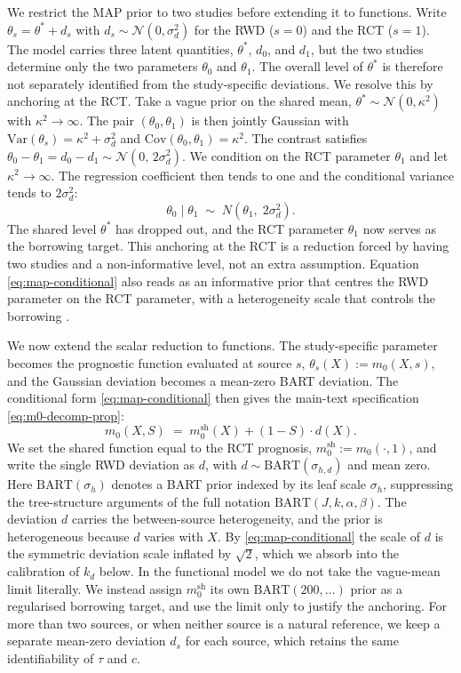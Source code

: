 We restrict the MAP prior to two studies before extending it to functions.
Write $\theta_s = \theta^* + d_s$ with $d_s \sim \mathcal{N}(0, \sigma_d^2)$ for the RWD ($s = 0$) and the RCT ($s = 1$).
The model carries three latent quantities, $\theta^*$, $d_0$, and $d_1$, but the two studies determine only the two parameters $\theta_0$ and $\theta_1$.
The overall level of $\theta^*$ is therefore not separately identified from the study-specific deviations.
We resolve this by anchoring at the RCT.
Take a vague prior on the shared mean, $\theta^* \sim \mathcal{N}(0, \kappa^2)$ with $\kappa^2 \to \infty$.
The pair $(\theta_0, \theta_1)$ is then jointly Gaussian with $\mathrm{Var}(\theta_s) = \kappa^2 + \sigma_d^2$ and $\mathrm{Cov}(\theta_0, \theta_1) = \kappa^2$.
The contrast satisfies $\theta_0 - \theta_1 = d_0 - d_1 \sim \mathcal{N}(0,\, 2\sigma_d^2)$.
We condition on the RCT parameter $\theta_1$ and let $\kappa^2 \to \infty$.
The regression coefficient then tends to one and the conditional variance tends to $2\sigma_d^2$:
\begin{equation}
\theta_0 \mid \theta_1 \;\sim\; N\!\left(\theta_1,\; 2\sigma_d^2\right).
\label{eq:map-conditional}
\end{equation}
The shared level $\theta^*$ has dropped out, and the RCT parameter $\theta_1$ now serves as the borrowing target.
This anchoring at the RCT is a reduction forced by having two studies and a non-informative level, not an extra assumption.
Equation \eqref{eq:map-conditional} also reads as an informative prior that centres the RWD parameter on the RCT parameter, with a heterogeneity scale that controls the borrowing \citep{schmidli2014robust}.

We now extend the scalar reduction to functions.
The study-specific parameter becomes the prognostic function evaluated at source $s$, $\theta_s(X) := m_0(X, s)$, and the Gaussian deviation becomes a mean-zero BART deviation.
The conditional form \eqref{eq:map-conditional} then gives the main-text specification \eqref{eq:m0-decomp-prop}:
\begin{equation}
m_0(X, S) \;=\; m_0^{\mathrm{sh}}(X) + (1 - S) \cdot d(X).
\end{equation}
We set the shared function equal to the RCT prognosis, $m_0^{\mathrm{sh}} := m_0(\cdot, 1)$, and write the single RWD deviation as $d$, with $d \sim \mathrm{BART}(\sigma_{h, d})$ and mean zero.
Here $\mathrm{BART}(\sigma_h)$ denotes a BART prior indexed by its leaf scale $\sigma_h$, suppressing the tree-structure arguments of the full notation $\mathrm{BART}(J, k, \alpha, \beta)$.
The deviation $d$ carries the between-source heterogeneity, and the prior is heterogeneous because $d$ varies with $X$.
By \eqref{eq:map-conditional} the scale of $d$ is the symmetric deviation scale inflated by $\sqrt{2}$, which we absorb into the calibration of $k_d$ below.
In the functional model we do not take the vague-mean limit literally.
We instead assign $m_0^{\mathrm{sh}}$ its own $\mathrm{BART}(200, \ldots)$ prior as a regularised borrowing target, and use the limit only to justify the anchoring.
For more than two sources, or when neither source is a natural reference, we keep a separate mean-zero deviation $d_s$ for each source, which retains the same identifiability of $\tau$ and $c$.

